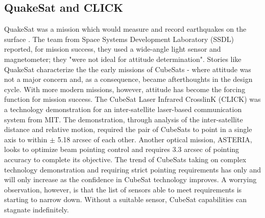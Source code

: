 \subsection*{QuakeSat and CLICK}
\par \qquad QuakeSat was a mission which would measure and record earthquakes on the surface \cite{QuakeSat}.
The team from Space Systems Development Laboratory (SSDL) reported, for mission success, they used a wide-angle light sensor and magnetometer; they "were not ideal for attitude determination"\cite{QuakeSat}.
Stories like QuakeSat characterize the the early missions of CubeSats - where attitude was not a major concern and, as a consequence, became afterthoughts in the design cycle.
With more modern missions, however, attitude has become the forcing function for mission success.
The CubeSat Laser Infrared CrosslinK (CLICK) was a technology demonstration for an inter-satellite laser-based communication system from MIT\cite{CubeSatCLICK}.
The demonstration, through analysis of the inter-satellite distance and relative motion, required the pair of CubeSats to point in a single axis to within $\pm$ 5.18 arcsec of each other.
Another optical mission, ASTERIA, looks to optimize beam pointing control and requires 3.3 arcsec \cite{OnOrbitBeamCalibration} of pointing accuracy to complete its objective.
The trend of CubeSats taking on complex technology demonstration and requiring strict pointing requirements has only and will only increase as the confidence in CubeSat technology improves.
A worrying observation, however, is that the list of sensors able to meet requirements is starting to narrow down. 
Without a suitable sensor, CubeSat capabilities can stagnate indefinitely.

